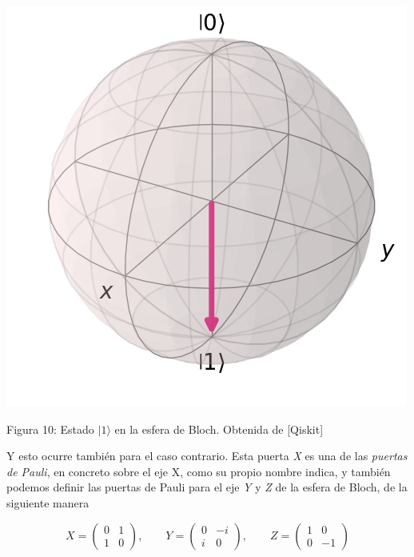 \documentclass[12pt]{article}
\numberwithin{equation}{section} %
\begin{document}
    \begin{minipage}{0.3\textwidth}
        \centering
        \includegraphics[width=\textwidth]{img/Bloch/bloch_state_1.png}
        \caption{Figura 10: Estado $|1\rangle$ en la esfera de Bloch. Obtenida de [Qiskit]}
    \end{minipage}
    \begin{minipage}{0.1\textwidth}
        \hfill
    \end{minipage}

    \vspace{5mm}

    Y esto ocurre también para el caso contrario. Esta puerta \textit{X} es una de las \textit{puertas de Pauli}, en concreto sobre el eje X, como su propio nombre indica, y también podemos definir las puertas de Pauli para el eje \textit{Y} y \textit{Z} de la esfera de Bloch, de la siguiente manera

    \begin{equation}
        X = \begin{pmatrix}
            0 & 1 \\
            1 & 0 
        \end{pmatrix}, \qquad Y = \begin{pmatrix}
            0 & -i \\
            i & 0
        \end{pmatrix}, \qquad Z = \begin{pmatrix}
            1 & 0 \\
            0 & -1
        \end{pmatrix}
        \label{eq: puertas_pauli}
    \end{equation}
\end{document}
